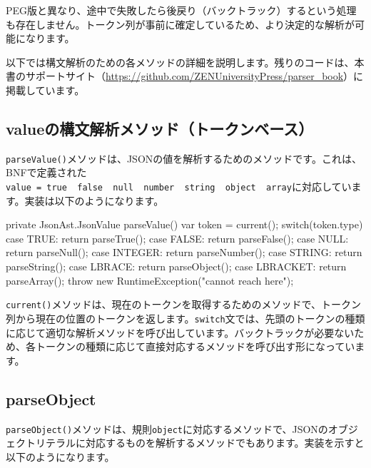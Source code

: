 PEG版と異なり、途中で失敗したら後戻り（バックトラック）するという処理も存在しません。トークン列が事前に確定しているため、より決定的な解析が可能になります。

以下では構文解析のための各メソッドの詳細を説明します。残りのコードは、本書のサポートサイト（\url{https://github.com/ZENUniversityPress/parser_book}）に掲載しています。

\subsection{valueの構文解析メソッド（トークンベース）}

\texttt{parseValue()}メソッドは、JSONの値を解析するためのメソッドです。これは、BNFで定義された\texttt{value\ =\ true\ \textbar{}\ false\ \textbar{}\ null\ \textbar{}\ number\ \textbar{}\ string\ \textbar{}\ object\ \textbar{}\ array}に対応しています。実装は以下のようになります。

\begin{codescreen}{}
    private JsonAst.JsonValue parseValue() {
        var token = current();
        switch(token.type) {
            case TRUE:
                return parseTrue();
            case FALSE:
                return parseFalse();
            case NULL:
                return parseNull();
            case INTEGER:
                return parseNumber();
            case STRING:
                return parseString();
            case LBRACE:
                return parseObject();
            case LBRACKET:
                return parseArray();
        }
        throw new RuntimeException("cannot reach here");
    }
\end{codescreen}

\texttt{current()}メソッドは、現在のトークンを取得するためのメソッドで、トークン列から現在の位置のトークンを返します。\texttt{switch}文では、先頭のトークンの種類に応じて適切な解析メソッドを呼び出しています。バックトラックが必要ないため、各トークンの種類に応じて直接対応するメソッドを呼び出す形になっています。

\subsection{parseObject}

\texttt{parseObject()}メソッドは、規則\texttt{object}に対応するメソッドで、JSONのオブジェクトリテラルに対応するものを解析するメソッドでもあります。実装を示すと以下のようになります。

